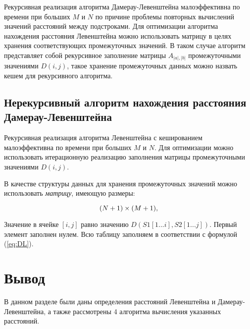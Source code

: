 Рекурсивная реализация алгоритма Дамерау-Левенштейна малоэффективна по времени при больших $M$ и $N$ по причине проблемы повторных вычислений значений расстояний между подстроками. Для оптимизации алгоритма нахождения расстояния Левенштейна можно использовать матрицу в целях хранения соответствующих промежуточных значений. В таком случае алгоритм представляет собой рекурсивное заполнение матрицы $A_{|a|,|b|}$ промежуточными значениями $D(i,j)$, такое хранение промежуточных данных можно назвать кешем для рекурсивного алгоритма.

\subsection{Нерекурсивный алгоритм нахождения расстояния Дамерау-Левенштейна}

Рекурсивная реализация алгоритма Левенштейна с кешированием малоэффективна по времени при больших $M$ и $N$. Для оптимизации можно использовать итерационную реализацию заполнения матрицы промежуточными значениями $D(i,j)$.

В качестве структуры данных для хранения промежуточных значений можно использовать \textit{матрицу}, имеющую  размеры:

\begin{equation}
	(N + 1)\\\times(M + 1),
\end{equation}

Значение в ячейке $[i, j]$ равно значению $D(S1[1...i], S2[1...j])$. Первый элемент заполнен нулем. Всю таблицу заполняем в соответствии с формулой (\ref{eq:DL}).



\section{Вывод}
В данном разделе были даны определения расстояний Левенштейна и Дамерау-Левенштейна, а также рассмотрены 4 алгоритма вычисления указанных расстояний.
